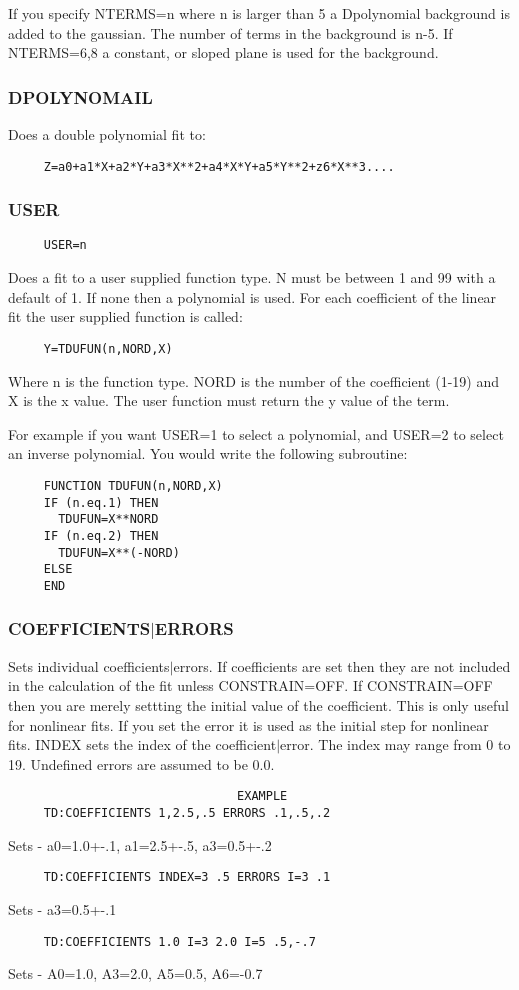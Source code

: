 If  you  specify  NTERMS=n  where  n  is  larger  than  5 a Dpolynomial
background is added to the  gaussian.   The  number  of  terms  in  the
background  is  n-5.  If NTERMS=6,8 a constant, or sloped plane is used
for the background.  
\subsubsection{DPOLYNOMAIL }
Does a double polynomial fit to:  
\begin{verbatim}
     Z=a0+a1*X+a2*Y+a3*X**2+a4*X*Y+a5*Y**2+z6*X**3....  
\end{verbatim}
\subsubsection{USER        }
\begin{verbatim}
     USER=n 
\end{verbatim}
Does  a  fit to a user supplied function type.  N must be between 1 and
99 with a default of 1.  If none then a polynomial is used.   For  each
coefficient of the linear fit the user supplied function is called:  
\begin{verbatim}
     Y=TDUFUN(n,NORD,X) 
\end{verbatim}
Where  n  is  the function type.  NORD is the number of the coefficient
(1-19) and X is the x value.  The user function must return the y value
of the term.  

For  example  if  you want USER=1 to select a polynomial, and USER=2 to
select  an  inverse  polynomial.   You  would   write   the   following
subroutine:  
\begin{verbatim}
     FUNCTION TDUFUN(n,NORD,X)
     IF (n.eq.1) THEN
       TDUFUN=X**NORD
     IF (n.eq.2) THEN
       TDUFUN=X**(-NORD)
     ELSE
     END
\end{verbatim}
\subsubsection{COEFFICIENTS$|$ERRORS}
Sets individual coefficients$|$errors.  If coefficients are set then they
are not included in the calculation of the  fit  unless  CONSTRAIN=OFF.
If  CONSTRAIN=OFF then you are merely settting the initial value of the
coefficient.  This is only useful for nonlinear fits.  If you  set  the
error  it  is  used as the initial step for nonlinear fits.  INDEX sets
the index of the coefficient$|$error.  The index may range from 0 to  19.
Undefined errors are assumed to be 0.0.  
\begin{verbatim}
                                EXAMPLE
     TD:COEFFICIENTS 1,2.5,.5 ERRORS .1,.5,.2 
\end{verbatim}
Sets - a0=1.0+-.1, a1=2.5+-.5, a3=0.5+-.2 
\begin{verbatim}
     TD:COEFFICIENTS INDEX=3 .5 ERRORS I=3 .1 
\end{verbatim}
Sets - a3=0.5+-.1 
\begin{verbatim}
     TD:COEFFICIENTS 1.0 I=3 2.0 I=5 .5,-.7 
\end{verbatim}
Sets - A0=1.0, A3=2.0, A5=0.5, A6=-0.7 
